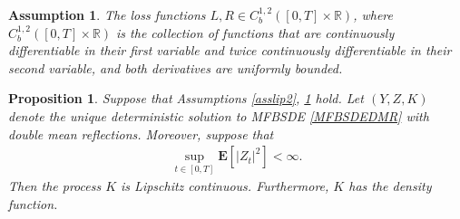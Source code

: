 \documentclass[10pt]{article}%
\numberwithin{equation}{section}
\newtheorem{proposition}[theorem]{Proposition}
\newtheorem{assumption}[theorem]{Assumption}
\def \E{\mathbf{E}}
\begin{document}
\begin{assumption}\label{assLRbounded}
    The loss functions $L,R \in C^{1,2}_b([0,T]\times\mathbb{R})$, where $C^{1,2}_b([0,T]\times\mathbb{R})$ is the collection  of functions that are continuously differentiable in their first variable and twice continuously differentiable in their second variable, and both
derivatives are uniformly bounded.
\end{assumption}
\begin{proposition}\label{Klip}
    Suppose that Assumptions \ref{asslip2}, \ref{assLRbounded} hold.  Let $(Y,Z,K)$ denote the unique deterministic solution to MFBSDE \eqref{MFBSDEDMR} with double mean reflections. Moreover, suppose that 
    \begin{align}\label{bdd of Z}
        \sup_{t\in[0,T]}\E[|Z_t|^2]<\infty.
    \end{align}
Then the process $K$ is Lipschitz continuous. Furthermore, $K$ has the density function.
\end{proposition}
\end{document}
